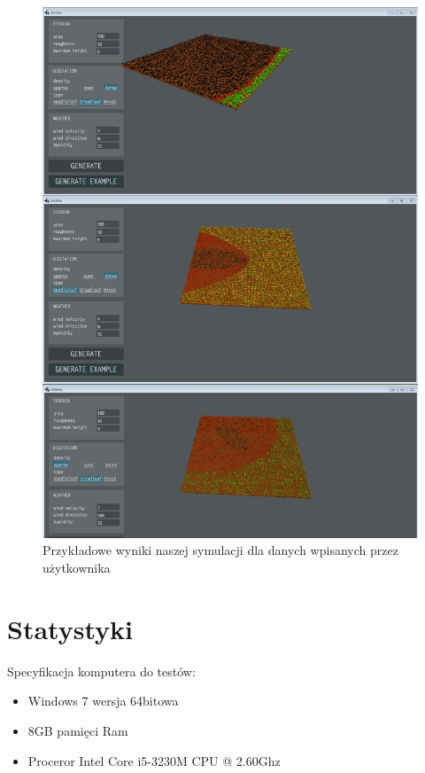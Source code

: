\documentclass[a4paper, 11pt]{article}
\begin{document}
\begin{figure}[H]
		\centerline{\includegraphics[scale=0.4]{test2}}
		\raggedright{	\caption{Przykładowe wyniki naszej symulacji dla danych wpisanych przez użytkownika}}
	\end{figure}
	\section*{Statystyki}
	\indent
	Specyfikacja komputera do testów:\\
	\begin{itemize}
	\item Windows 7 wersja 64bitowa
	\item 8GB pamięci Ram
	\item Proceror Intel Core i5-3230M CPU @ 2.60Ghz
\end{itemize}		
	
\end{document}
